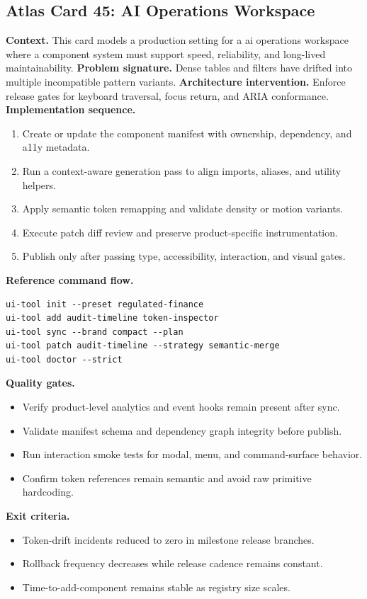 \subsection*{Atlas Card 45: AI Operations Workspace}
\textbf{Context.} This card models a production setting for a ai operations workspace where a component system must support speed, reliability, and long-lived maintainability.
\textbf{Problem signature.} Dense tables and filters have drifted into multiple incompatible pattern variants.
\textbf{Architecture intervention.} Enforce release gates for keyboard traversal, focus return, and ARIA conformance.
\textbf{Implementation sequence.}
\begin{enumerate}[leftmargin=*, itemsep=0.28em]
  \item Create or update the component manifest with ownership, dependency, and a11y metadata.
  \item Run a context-aware generation pass to align imports, aliases, and utility helpers.
  \item Apply semantic token remapping and validate density or motion variants.
  \item Execute patch diff review and preserve product-specific instrumentation.
  \item Publish only after passing type, accessibility, interaction, and visual gates.
\end{enumerate}
\textbf{Reference command flow.}
\begin{verbatim}
ui-tool init --preset regulated-finance
ui-tool add audit-timeline token-inspector
ui-tool sync --brand compact --plan
ui-tool patch audit-timeline --strategy semantic-merge
ui-tool doctor --strict
\end{verbatim}
\textbf{Quality gates.}
\begin{itemize}[leftmargin=*, itemsep=0.24em]
  \item Verify product-level analytics and event hooks remain present after sync.
  \item Validate manifest schema and dependency graph integrity before publish.
  \item Run interaction smoke tests for modal, menu, and command-surface behavior.
  \item Confirm token references remain semantic and avoid raw primitive hardcoding.
\end{itemize}
\textbf{Exit criteria.}
\begin{itemize}[leftmargin=*, itemsep=0.24em]
  \item Token-drift incidents reduced to zero in milestone release branches.
  \item Rollback frequency decreases while release cadence remains constant.
  \item Time-to-add-component remains stable as registry size scales.
\end{itemize}
\clearpage
